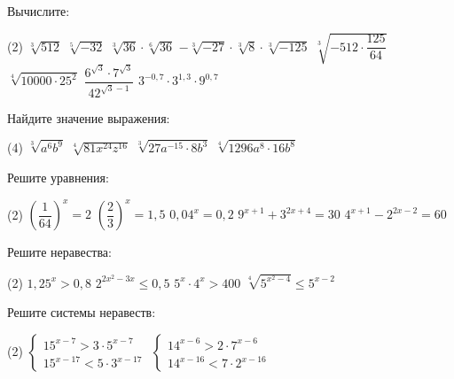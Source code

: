 \begin{exam}
	\begin{listofex}
		\item Вычислите:
		\begin{tasks}(2)
			\task \( \sqrt[3]{512} \)
			\task \( \sqrt[5]{-32} \)
			\task \( \sqrt[3]{36} \cdot \sqrt[6]{36} \)
			\task \( -\sqrt[3]{-27} \cdot \sqrt[3]{8} \cdot \sqrt[3]{-125} \)
			\task \( \sqrt[3]{-512 \cdot \dfrac{125}{64}} \)
			\task \( \sqrt[4]{10000 \cdot 25^2} \)
			\task \( \dfrac{6^{\sqrt{3}}\cdot7^{\sqrt{3}}}{42^{\sqrt{3}-1}} \)
			\task \( 3^{-0,7}\cdot 3^{1,3} \cdot 9^{0,7}\)
		\end{tasks}
		\item Найдите значение выражения:
		\begin{tasks}(4)
			\task \( \sqrt[3]{a^6b^9} \)
			\task \( \sqrt[4]{81x^{24}z^{16}} \)
			\task \( \sqrt[3]{27a^{-15} \cdot 8b^3} \)
			\task \( \sqrt[4]{1296a^8 \cdot 16 b^8} \)
		\end{tasks}
		\item Решите уравнения:
		\begin{tasks}(2)
			\task \( \left( \dfrac{1}{64} \right)^x=2  \)
			\task \( \left( \dfrac{2}{3} \right)^x=1,5 \)
			\task \( 0,04^x=0,2 \)
			\task \( 9^{x+1}+3^{2x+4}=30 \)
			\task \( 4^{x+1}-2^{2x-2}=60 \)
		\end{tasks}
		\item Решите неравества:
		\begin{tasks}(2)
			\task \( 1,25^x > 0,8 \)
			\task \( 2^{2x^2-3x} \le 0,5 \)
			\task \( 5^x \cdot 4^x > 400 \)
			\task \( \sqrt[4]{5^{x^2-4}}\le 5^{x-2} \)
		\end{tasks}
		\item Решите системы неравеств:
		\begin{tasks}(2)
			\task \( \begin{cases} 15^{x-7}> 3 \cdot 5^{x-7} \\ 15^{x-17} < 5 \cdot 3^{x-17} \end{cases} \)
			\task \( \begin{cases} 14^{x-6} > 2 \cdot 7^{x-6} \\ 14^{x-16} < 7 \cdot 2^{x-16} \end{cases} \)
		\end{tasks}
		
	\end{listofex}
\end{exam}

